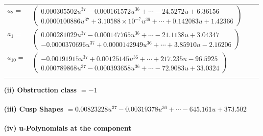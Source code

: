 \documentclass[1p]{elsarticle_modified}
\theoremstyle{definition}
\begin{document}
\begin{tabular}{m{7pt} m{180pt} m{7pt} m{180pt} }
\flushright $a_{2}=$&$\begin{pmatrix}0.000305502 u^{37}-0.000161572 u^{36}+\cdots-24.5272 u+6.36156\\0.0000100886 u^{37}+3.10588\times10^{-7} u^{36}+\cdots+0.142083 u+1.42366\end{pmatrix}$ \\
\flushright $a_{1}=$&$\begin{pmatrix}0.000281029 u^{37}-0.000147765 u^{36}+\cdots-21.1138 u+3.04347\\-0.0000370696 u^{37}+0.0000142949 u^{36}+\cdots+3.85910 u-2.16206\end{pmatrix}$ \\
\flushright $a_{10}=$&$\begin{pmatrix}-0.00191915 u^{37}+0.00125145 u^{36}+\cdots+217.235 u-96.5925\\0.000789868 u^{37}-0.000393658 u^{36}+\cdots-72.9083 u+33.0324\end{pmatrix}$\\&\end{tabular}
\flushleft \textbf{(ii) Obstruction class $= -1$}\\~\\
\flushleft \textbf{(iii) Cusp Shapes $= 0.00823228 u^{37}-0.00319378 u^{36}+\cdots-645.161 u+373.502$}\\~\\
\newpage\renewcommand{\arraystretch}{1}
\flushleft \textbf{(iv) u-Polynomials at the component}\newline \\
\end{document}
